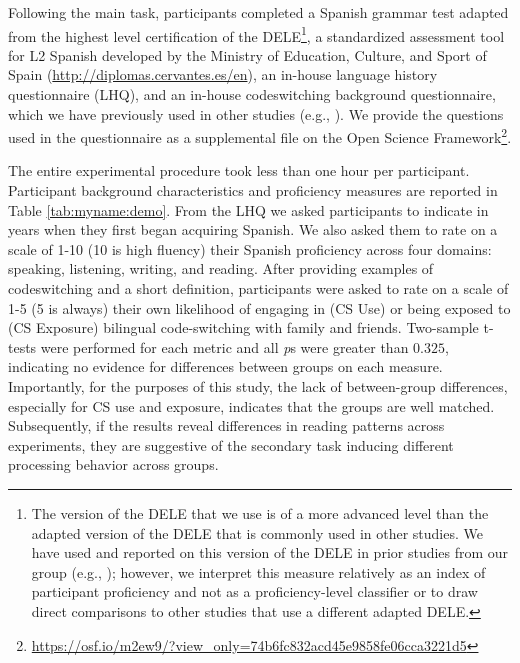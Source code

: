 \documentclass[output=paper,colorlinks,citecolor=brown]{langscibook}
\begin{document}
Following the main task, participants completed a Spanish grammar test adapted from the highest level certification of the DELE\footnote{The version of the DELE that we use is of a more advanced level than the adapted version of the DELE that is commonly used in other studies. We have used and reported on this version of the DELE in prior studies from our group (e.g., \cite{Dussiasetal2013,GuzzardoTamargoetal2016,ValdesKroffetal2017}); however, we interpret this measure relatively as an index of participant proficiency and not as a proficiency-level classifier or to draw direct comparisons to other studies that use a different adapted DELE.}, a standardized assessment tool for L2 Spanish developed by the Ministry of Education, Culture, and Sport of Spain (\url{http://diplomas.cervantes.es/en}), an in-house language history questionnaire (LHQ), and an in-house codeswitching background questionnaire, which we have previously used in other studies (e.g., \cite{GuzzardoTamargoetal2016,ValdesKroffetal2017}). We provide the questions used in the questionnaire as a supplemental file on the Open Science Framework\footnote{\url{https://osf.io/m2ew9/?view_only=74b6fc832acd45e9858fe06cca3221d5}}.

The entire experimental procedure took less than one hour per participant. Participant background characteristics and proficiency measures are reported in Table \ref{tab:myname:demo}. From the LHQ we asked participants to indicate in years when they first began acquiring Spanish. We also asked them to rate on a scale of 1-10 (10 is high fluency) their Spanish proficiency across four domains: speaking, listening, writing, and reading. After providing examples of codeswitching and a short definition, participants were asked to rate on a scale of 1-5 (5 is always) their own likelihood of engaging in (CS Use) or being exposed to (CS Exposure) bilingual code-switching with family and friends.  Two-sample t-tests were performed for each metric and all \textit{p}s were greater than $0.325$, indicating no evidence for differences between groups on each measure. Importantly, for the purposes of this study, the lack of between-group differences, especially for CS use and exposure, indicates that the groups are well matched. Subsequently, if the results reveal differences in reading patterns across experiments, they are suggestive of the secondary task inducing different processing behavior across groups.
\end{document}
